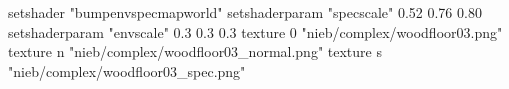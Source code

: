 setshader "bumpenvspecmapworld"
setshaderparam "specscale" 0.52 0.76 0.80
setshaderparam "envscale"  0.3 0.3 0.3
   texture 0 "nieb/complex/woodfloor03.png"
   texture n "nieb/complex/woodfloor03_normal.png"
   texture s "nieb/complex/woodfloor03_spec.png"